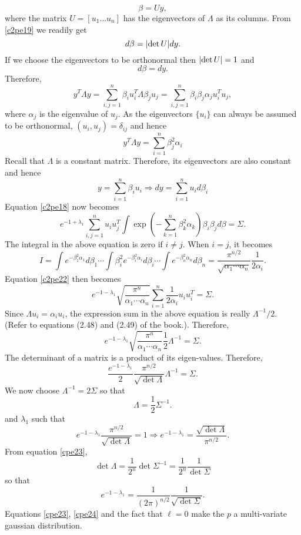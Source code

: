 \begin{enumerate}
\begin{equation}
\beta = Uy,
\end{equation}
where the matrix $U = [u_1 \ldots u_n]$ has the eigenvectors of $\Lambda$ as its columns. From \eqref{c2pe19}
we readily get 
\begin{equation}\label{c2pe20}
d\beta = \lvert\det U\rvert dy.
\end{equation}
If we choose the eigenvectors to be orthonormal then $\lvert\det U\rvert = 1$ and 
\begin{equation}\label{c2pe21}
d\beta = dy.
\end{equation}
Therefore,
\[
y^T\Lambda y = \sum_{i,j=1}^n \beta_i u_i^T \Lambda \beta_j u_j = \sum_{i,j=1}^n \beta_i\beta_j\alpha_j u_i^T u_j,
\]
where $\alpha_j$ is the eigenvalue of $u_j$. As the eigenvectors $\{u_i\}$ can always be 
assumed to be orthonormal, $(u_i, u_j) = \delta_{ij}$ and hence
\[
y^T\Lambda y = \sum_{i=1}^n \beta_j^2\alpha_i
\]
Recall that $\Lambda$ is a constant matrix. Therefore, its eigenvectors are also constant and hence
\[
y = \sum_{i=1}^n\beta_i u_i \Rightarrow dy = \sum_{i=1}^n u_i d\beta_i
\]
Equation \eqref{c2pe18} now becomes
\begin{equation}\label{c2pe22}
e^{-1+\lambda_1}\sum_{i,j=1}^nu_iu_j^T\int \exp\left(-\sum_{k=1}^n\beta_k^2\alpha_k\right)\beta_i\beta_j d\beta = \Sigma.
\end{equation}
The integral in the above equation is zero if $i \ne j$. When $i = j$, it becomes
\[
I = \int e^{-\beta_1^2\alpha_1}d\beta_1 \cdots \int \beta_i^2e^{-\beta_i^2\alpha_i}d\beta_i \cdots \int e^{-\beta_n^2\alpha_n}d\beta_n = \frac{\pi^{n/2}}{\sqrt{\alpha_1 \cdots \alpha_n}}\frac{1}{2\alpha_i}.
\]
Equation \eqref{c2pe22} then becomes
\[
e^{-1-\lambda_1}\sqrt{\frac{\pi^n}{\alpha_1\cdots\alpha_n}}\sum_{i=1}^n \frac{1}{2\alpha_i}u_iu_i^T = \Sigma.
\]
Since $\Lambda u_i = \alpha_i u_i$, the expression sum in the above equation is really $\Lambda^{-1}/2$.
(Refer to equations (2.48) and (2.49) of the book.). Therefore,
\[
e^{-1 - \lambda_1}\sqrt{\frac{\pi^n}{\alpha_1\cdots\alpha_n}}\frac{1}{2}\Lambda^{-1} = \Sigma.
\]
The determinant of a matrix is a product of its eigen-values. Therefore,
\[
\frac{e^{-1 - \lambda_1}}{2}\frac{\pi^{n/2}}{\sqrt{\det\Lambda}}\Lambda^{-1} = \Sigma.
\]
We now choose $\Lambda^{-1} = 2\Sigma$ so that
\begin{equation}\label{cpe23}
\Lambda = \frac{1}{2}\Sigma^{-1}.
\end{equation}
and $\lambda_1$ such that 
\[
e^{-1 - \lambda_1}\frac{\pi^{n/2}}{\sqrt{\det\Lambda}} = 1 \Rightarrow e^{-1-\lambda_1} = \frac{\sqrt{\det\Lambda}}{\pi^{n/2}}.
\]
From equation \eqref{cpe23}, 
\[
\det\Lambda = \frac{1}{2^n}\det\Sigma^{-1} = \frac{1}{2^n}\frac{1}{\det\Sigma}
\]
so that
\begin{equation}\label{cpe24}
e^{-1 - \lambda_1} = \frac{1}{(2\pi)^{n/2}}\frac{1}{\sqrt{\det\Sigma}}.
\end{equation}
Equations \eqref{cpe23}, \eqref{cpe24} and the fact that $\ell = 0$ make the $p$ a multi-variate
gaussian distribution.


\end{enumerate}
